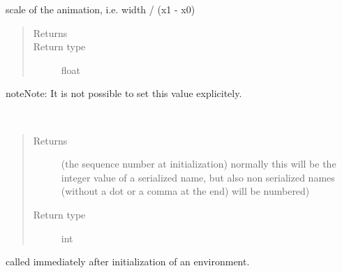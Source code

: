 \documentclass[letterpaper,10pt,english]{sphinxmanual}
\begin{document}
\begin{fulllineitems}
\begin{fulllineitems}
\end{fulllineitems}


\begin{fulllineitems}
\label{\detokenize{Reference:salabim.Environment.scale}}
scale of the animation, i.e. width / (x1 - x0)
\begin{quote}\begin{description}
\item[{Returns}] \leavevmode
{}

\item[{Return type}] \leavevmode
float

\end{description}\end{quote}

\begin{sphinxadmonition}{note}{Note:}
It is not possible to set this value explicitely.
\end{sphinxadmonition}

\end{fulllineitems}


\begin{fulllineitems}
\label{\detokenize{Reference:salabim.Environment.sequence_number}}~\begin{quote}\begin{description}
\item[{Returns}] \leavevmode
{} \textendash{} (the sequence number at initialization) 
normally this will be the integer value of a serialized name,
but also non serialized names (without a dot or a comma at the end)
will be numbered)

\item[{Return type}] \leavevmode
int

\end{description}\end{quote}

\end{fulllineitems}


\begin{fulllineitems}
\label{\detokenize{Reference:salabim.Environment.setup}}
called immediately after initialization of an environment.


\end{fulllineitems}
\end{fulllineitems}
\end{document}

